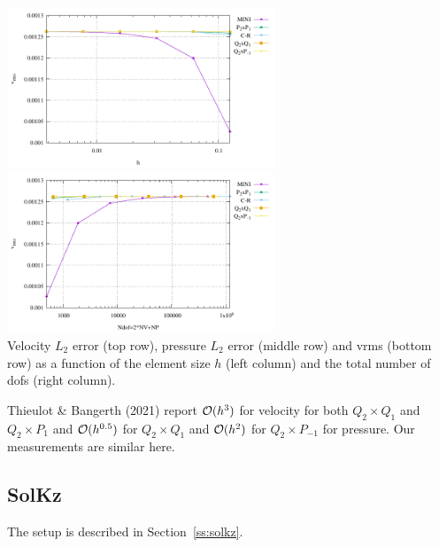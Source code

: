 \begin{center}
\includegraphics[width=8cm]{python_codes/fieldstone_112/results/exp3/vrms.pdf}
\includegraphics[width=8cm]{python_codes/fieldstone_112/results/exp3/vrms_ndof.pdf}\\
{\captionfont Velocity $L_2$ error (top row), pressure $L_2$ error (middle row) and vrms (bottom row) 
as a function of the element size $h$ (left column) and the total number of dofs (right column).}
\end{center}

Thieulot \& Bangerth (2021) \cite{thba22} report ${\cal O}(h^3)$ for velocity for both $Q_2\times Q_1$ and $Q_2\times P_1$
and ${\cal O}(h^{0.5})$ for $Q_2\times Q_1$ and  ${\cal O}(h^{2})$ for $Q_2\times P_{-1}$ for pressure. 
Our measurements are similar here.

\newpage
\subsection*{SolKz}

The setup is described in Section~\ref{ss:solkz}. 


